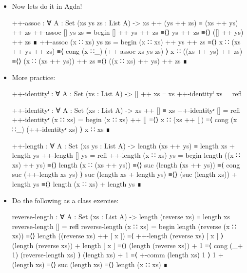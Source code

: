\documentclass{lecturenotes}
\newcommand{\cons}{\ensuremath{\mathbin{\textsf{::}}}}
\newcommand{\app}{\ensuremath{\mathbin{\textsf{++}}}}
\begin{document}
\begin{itemize}
\begin{proof}
    \noindent\textbf{Inductive case ($xs = x \cons xs'$):}
    $$
    \begin{array}{l@{=\langle}c@{\rangle}}
      (x \cons xs') \app (ys \app zs) & \text{computation}\\
      x \cons (xs' \app (ys \app zs)) & \text{IH}\\
      x \cons ((xs' \app ys) \app zs) & \text{computation}\\
      (x \cons (xs' \app ys)) \app zs & \text{computation}\\
      \multicolumn{2}{l}{((x \cons xs') \app ys) \app zs}
    \end{array}
    $$
  \end{proof}
\pagebreak
\item Now lets do it in Agda!
\begin{code}
++-assoc : ∀ {A : Set} (xs ys zs : List A) -> xs ++ (ys ++ zs) ≡ (xs ++ ys) ++ zs
++-assoc [] ys zs =
  begin
    [] ++ ys ++ zs
  ≡⟨⟩
    ys ++ zs
  ≡⟨⟩
    ([] ++ ys) ++ zs
  ∎
++-assoc (x ∷ xs) ys zs =
  begin
    (x ∷ xs) ++ ys ++ zs
  ≡⟨⟩
    x ∷ (xs ++ ys ++ zs)
  ≡⟨ cong (x ∷_) (++-assoc xs ys zs) ⟩
    x ∷ ((xs ++ ys) ++ zs)
  ≡⟨⟩
    (x ∷ (xs ++ ys)) ++ zs
  ≡⟨⟩
    ((x ∷ xs) ++ ys) ++ zs
  ∎
\end{code}
\item More practice:
\begin{code}
++-identityˡ : ∀ {A : Set} (xs : List A) -> [] ++ xs ≡ xs
++-identityˡ xs = refl

++-identityʳ : ∀ {A : Set} (xs : List A) -> xs ++ [] ≡ xs
++-identityʳ [] = refl
++-identityʳ (x ∷ xs) =
  begin
     (x ∷ xs) ++ []
  ≡⟨⟩
    x ∷ (xs ++ [])
  ≡⟨ cong (x ∷_) (++-identityʳ xs) ⟩
    x ∷ xs
  ∎

++-length : ∀ {A : Set} (xs ys : List A) -> length (xs ++ ys) ≡ length xs + length ys
++-length [] ys = refl
++-length (x ∷ xs) ys =
  begin
    length ((x ∷ xs) ++ ys)
  ≡⟨⟩
    length (x ∷ (xs ++ ys))
  ≡⟨⟩
    suc (length (xs ++ ys))
  ≡⟨ cong suc (++-length xs ys) ⟩
    suc (length xs + length ys)
  ≡⟨⟩
    (suc (length xs)) + length ys
  ≡⟨⟩
    length (x ∷ xs) + length ys
  ∎
\end{code}
\item Do the following as a class exercise:
\begin{code}
reverse-length : ∀ {A : Set} (xs : List A) -> length (reverse xs) ≡ length xs
reverse-length [] = refl
reverse-length (x ∷ xs) =
  begin
    length (reverse (x ∷ xs))
  ≡⟨⟩
    length ((reverse xs) ++ [ x ])
  ≡⟨ ++-length (reverse xs) [ x ] ⟩
    (length (reverse xs)) + length [ x ]
  ≡⟨⟩
    (length (reverse xs)) + 1
  ≡⟨ cong (_+ 1) (reverse-length xs) ⟩
    (length xs) + 1
  ≡⟨ +-comm (length xs) 1 ⟩
    1 + (length xs)
  ≡⟨⟩
    suc (length xs)
  ≡⟨⟩
    length (x ∷ xs)
  ∎
\end{code}


\end{itemize}
\end{document}
